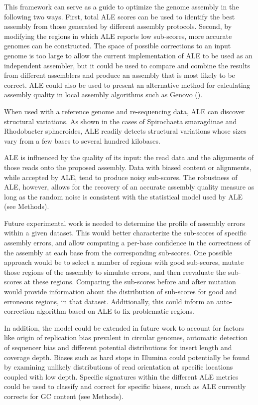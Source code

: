 \documentclass[phd,tocprelim]{cornell}
\begin{document}
This framework can serve as a guide to optimize the genome assembly in the following two ways. First, total ALE scores can be used to identify the best assembly from those generated by different assembly protocols. Second, by modifying the regions in which ALE reports low sub-scores, more accurate genomes can be constructed. The space of possible corrections to an input genome is too large to allow the current implementation of ALE to be used as an independent assembler, but it could be used to compare and combine the results from different assemblers and produce an assembly that is most likely to be correct. ALE could also be used to present an alternative method for calculating assembly quality in local assembly algorithms such as Genovo (\cite{Laserson2011}).

When used with a reference genome and re-sequencing data, ALE can discover structural variations. As shown in the cases of Spirochaeta smaragdinae and Rhodobacter sphaeroides, ALE readily detects structural variations whose sizes vary from a few bases to several hundred kilobases.

ALE is influenced by the quality of its input: the read data and the alignments of those reads onto the proposed assembly. Data with biased content or alignments, while accepted by ALE, tend to produce noisy sub-scores. The robustness of ALE, however, allows for the recovery of an accurate assembly quality measure as long as the random noise is consistent with the statistical model used by ALE (see Methods).

Future experimental work is needed to determine the profile of assembly errors within a given dataset.  This would better characterize the sub-scores of specific assembly errors, and allow computing a per-base confidence in the correctness of the assembly at each base from the corresponding sub-scores.  One possible approach would be to select a number of regions with good sub-scores, mutate those regions of the assembly to simulate errors, and then reevaluate the sub-scores at these regions.  Comparing the sub-scores before and after mutation would provide information about the distribution of sub-scores for good and erroneous regions, in that dataset.  Additionally, this could inform an auto-correction algorithm based on ALE to fix problematic regions.

In addition, the model could be extended in future work to account for factors like origin of replication bias prevalent in circular genomes, automatic detection of sequencer bias and different potential distributions for insert length and coverage depth. Biases such as hard stops in Illumina could potentially be found by examining unlikely distributions of read orientation at specific locations coupled with low depth. Specific signatures within the different ALE metrics could be used to classify and correct for specific biases, much as ALE currently corrects for GC content (see Methods).
\end{document}
